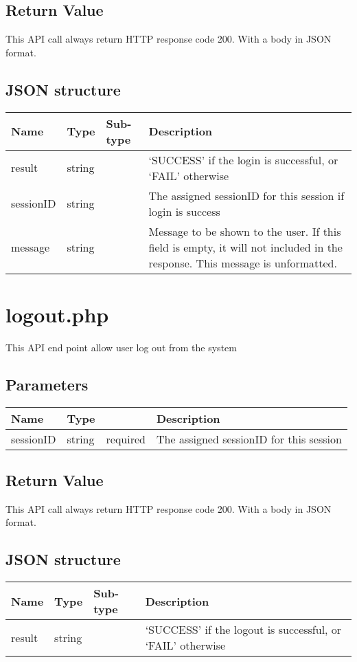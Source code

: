 \documentclass[a4paper,12pt]{report}
\begin{document}
	\subsection{Return Value}
	This API call always return HTTP response code 200. With a body in JSON format.
	\subsection{JSON structure}
	\begin{tabular}{|l|l|l|p{10cm}|}
		\hline
		Name & Type & Sub-type & Description\\\hline
		result & string & & 	`SUCCESS' if the login is successful, or\newline
									`FAIL' otherwise\\\hline
		sessionID & string & & The assigned sessionID for this session if login is success\\\hline
		message & string & & Message to be shown to the user. If this field is empty, it will not included in the response. This message is unformatted.\\\hline
	\end{tabular}
	\section{logout.php}
	This API end point allow user log out from the system
	\subsection{Parameters}
	\begin{tabular}{|l|ll|p{10cm}|}
		\hline
		Name & Type & & Description\\\hline
		sessionID & string & required & The assigned sessionID for this session\\\hline
	\end{tabular}
	\subsection{Return Value}
	This API call always return HTTP response code 200. With a body in JSON format.
	\subsection{JSON structure}
	\begin{tabular}{|l|l|l|p{10cm}|}
		\hline
		Name & Type & Sub-type & Description\\\hline
		result & string &  & 	`SUCCESS' if the logout is successful, or\newline
		`FAIL' otherwise\\\hline
	\end{tabular}
\end{document}

